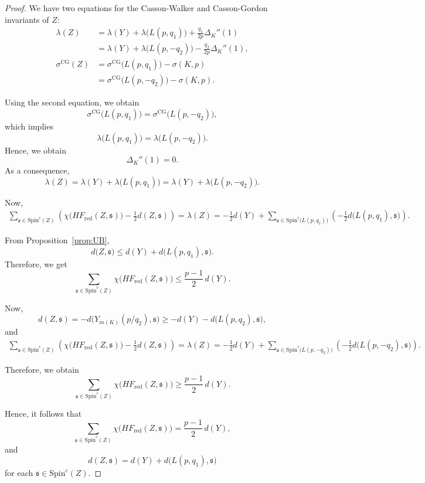 \documentclass[12pt]{amsart}
\theoremstyle{definition}
\theoremstyle{definition}
\newcommand{\Spin}{\text{Spin}}
\newcommand{\HF}{HF}
\newcommand{\din}{d}
\begin{document}
\begin{proof}
   We have two equations for the Casson-Walker and Casson-Gordon invariants of \(Z\):
\[
\begin{aligned}
\lambda(Z)
&= \lambda(Y)+\lambda\bigl(L(p,q_1)\bigr)+\frac{q_1}{2p}\Delta_K''(1) \\
&= \lambda(Y)+\lambda\bigl(L(p,-q_2)\bigr)-\frac{q_2}{2p}\Delta_K''(1), \\
\sigma^{\mathrm{CG}}(Z)
&= \sigma^{\mathrm{CG}}\bigl(L(p,q_1)\bigr)-\sigma(K,p) \\
&= \sigma^{\mathrm{CG}}\bigl(L(p,-q_2)\bigr)-\sigma(K,p).
\end{aligned}
\]

Using the second equation, we obtain
\[
\sigma^{\mathrm{CG}}\bigl(L(p,q_1)\bigr)=\sigma^{\mathrm{CG}}\bigl(L(p,-q_2)\bigr),
\]
which implies
\[
\lambda\bigl(L(p,q_1)\bigr)=\lambda\bigl(L(p,-q_2)\bigr).
\]
Hence, we obtain
\[
\Delta_K''(1)=0.
\]
As a consequence,
\[
\lambda(Z)=\lambda(Y)+\lambda\bigl(L(p,q_1)\bigr)=\lambda(Y)+\lambda\bigl(L(p,-q_2)\bigr).
\]

Now,
\[
\begin{aligned}
\sum_{\mathfrak{s} \in \Spin^c(Z)}
\left(
\chi\bigl(\HF_{\mathrm{red}}(Z,\mathfrak{s})\bigr)
-\frac{1}{2}d(Z,\mathfrak{s})
\right)
= \lambda(Z) 
= -\frac{1}{2}\din(Y)
+ \sum_{\mathfrak{s} \in \Spin^c\!\bigl(L(p,q_1)\bigr)}
\left(-\frac{1}{2}d\bigl(L(p,q_1),\mathfrak{s}\bigr)\right).
\end{aligned}
\]

From Proposition~\ref{prop:UB},
\[
\din\bigl(Z,\mathfrak{s}\bigr)
\le \din(Y)+\din\bigl(L(p,q_1),\mathfrak{s}\bigr).
\]
Therefore, we get
\[
\sum_{\mathfrak{s} \in \Spin^c(Z)}
\chi\bigl(\HF_{\mathrm{red}}(Z,\mathfrak{s})\bigr)
\le \frac{p-1}{2}\,\din(Y).
\]

Now,
\[
\din(Z,\mathfrak{s})
= -\din\bigl(Y_{m(K)}(p/q_2),\mathfrak{s}\bigr)
\ge -\din(Y)-\din\bigl(L(p,q_2),\mathfrak{s}\bigr),
\]
and
\[
\begin{aligned}
\sum_{\mathfrak{s} \in \Spin^c(Z)}
\left(
\chi\bigl(\HF_{\mathrm{red}}(Z,\mathfrak{s})\bigr)
-\frac{1}{2}d(Z,\mathfrak{s})
\right)
= \lambda(Z) 
= -\frac{1}{2}\din(Y)
+ \sum_{\mathfrak{s} \in \Spin^c\!\bigl(L(p,-q_2)\bigr)}
\left(-\frac{1}{2}d\bigl(L(p,-q_2),\mathfrak{s}\bigr)\right).
\end{aligned}
\]

Therefore, we obtain
\[
\sum_{\mathfrak{s} \in \Spin^c(Z)}
\chi\bigl(\HF_{\mathrm{red}}(Z,\mathfrak{s})\bigr)
\ge \frac{p-1}{2}\,\din(Y).
\]

Hence, it follows that
\[
\sum_{\mathfrak{s} \in \Spin^c(Z)}
\chi\bigl(\HF_{\mathrm{red}}(Z,\mathfrak{s})\bigr)
= \frac{p-1}{2}\,\din(Y),
\]
and
\[
\din(Z,\mathfrak{s})
= \din(Y)+\din\bigl(L(p,q_1),\mathfrak{s}\bigr)
\]
for each \(\mathfrak{s} \in \Spin^c(Z)\).

\end{proof}
\end{document}
